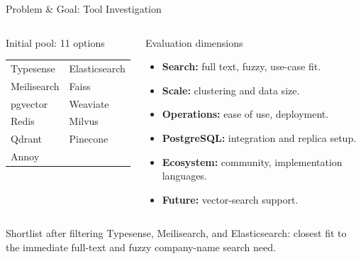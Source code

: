 \documentclass[aspectratio=169]{beamer}
\begin{document}
\begin{frame}{Problem \& Goal: Tool Investigation}
  \begin{columns}[T,totalwidth=\textwidth]
      \begin{block}{Initial pool: 11 options}
        \small
        \renewcommand{\arraystretch}{1.35}
        \begin{tabular}{@{}ll@{}}
          Typesense & Elasticsearch \\
          Meilisearch & Faiss \\
          pgvector & Weaviate \\
          Redis & Milvus \\
          Qdrant & Pinecone \\
          Annoy & \\
        \end{tabular}
      \end{block}
      \begin{block}{Evaluation dimensions}
        \footnotesize
        \begin{itemize}
          \item \textbf{Search:} full text, fuzzy, use-case fit.
          \item \textbf{Scale:} clustering and data size.
          \item \textbf{Operations:} ease of use, deployment.
          \item \textbf{PostgreSQL:} integration and replica setup.
          \item \textbf{Ecosystem:} community, implementation languages.
          \item \textbf{Future:} vector-search support.
        \end{itemize}
      \end{block}
  \end{columns}
  \vspace{0.15cm}
  \begin{block}{Shortlist after filtering}
    Typesense, Meilisearch, and Elasticsearch: closest fit to the immediate full-text and fuzzy company-name search need.
  \end{block}
\end{frame}
\end{document}
